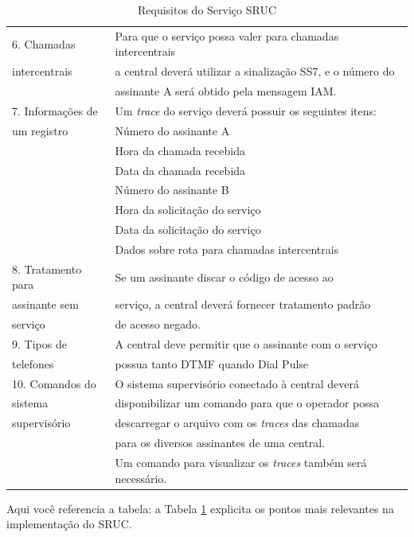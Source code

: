 \begin{table}
\begin{tabular}{|l|l|}
		6. Chamadas  				& Para que o serviço possa valer para chamadas intercentrais \\
			 intercentrais		& a central deverá utilizar a sinalização SS7, e o número do \\
												& assinante A será obtido pela mensagem IAM. \\ \hline
		7. Informações de 	& Um \textit{trace} do serviço deverá possuir os seguintes itens:\\
			 um registro			& Número do assinante A \\
												& Hora da chamada recebida\\
												& Data da chamada recebida\\
												& Número do assinante B\\
												& Hora da solicitação do serviço\\
												& Data da solicitação do serviço\\
												& Dados sobre rota para chamadas intercentrais \\ \hline
		8. Tratamento para 	& Se um assinante discar o código de acesso ao \\
		   assinante sem 		& serviço, a central deverá fornecer tratamento padrão \\
			 serviço					& de acesso negado. \\ \hline
		9. Tipos de 				& A central deve permitir que o assinante com o serviço \\
		   telefones				& possua tanto DTMF quando Dial Pulse \\ \hline
		10. Comandos do 		& O sistema supervisório conectado à central deverá \\
		    sistema 				& disponibilizar um  comando para que o operador possa  \\
		    supervisório		& descarregar o arquivo com os \textit{traces} das chamadas \\
		    								& para os diversos assinantes de uma central. \\
												& Um comando para visualizar os \textit{traces} também será necessário. \\ \hline
		\end{tabular}
	\caption{Requisitos do Serviço SRUC}
	\label{tab:RequisitosDoServiçoSRUC}
\end{table}

Aqui você referencia a tabela: a Tabela \ref{tab:RequisitosDoServiçoSRUC} explicita os pontos mais relevantes na implementação do SRUC.

